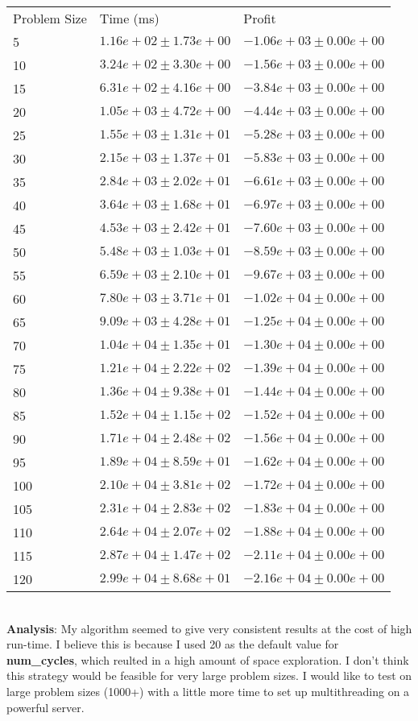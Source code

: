 \documentclass[11pt]{article}
\begin{document}
\begin{enumerate}
\begin{enumerate}
	\begin{tabular}{lll}
		Problem Size & Time (ms)         & Profit             \\
		5            & $1.16e+02\pm1.73e+00$ & $-1.06e+03\pm0.00e+00$ \\
		10           & $3.24e+02\pm3.30e+00$ & $-1.56e+03\pm0.00e+00$ \\
		15           & $6.31e+02\pm4.16e+00$ & $-3.84e+03\pm0.00e+00$ \\
		20           & $1.05e+03\pm4.72e+00$ & $-4.44e+03\pm0.00e+00$ \\
		25           & $1.55e+03\pm1.31e+01$ & $-5.28e+03\pm0.00e+00$ \\
		30           & $2.15e+03\pm1.37e+01$ & $-5.83e+03\pm0.00e+00$ \\
		35           & $2.84e+03\pm2.02e+01$ & $-6.61e+03\pm0.00e+00$ \\
		40           & $3.64e+03\pm1.68e+01$ & $-6.97e+03\pm0.00e+00$ \\
		45           & $4.53e+03\pm2.42e+01$ & $-7.60e+03\pm0.00e+00$ \\
		50           & $5.48e+03\pm1.03e+01$ & $-8.59e+03\pm0.00e+00 $\\
		55           & $6.59e+03\pm2.10e+01$ & $-9.67e+03\pm0.00e+00$ \\
		60           & $7.80e+03\pm3.71e+01$ & $-1.02e+04\pm0.00e+00$ \\
		65           & $9.09e+03\pm4.28e+01$ & $-1.25e+04\pm0.00e+00$ \\
		70           & $1.04e+04\pm1.35e+01$ & $-1.30e+04\pm0.00e+00$ \\
		75           & $1.21e+04\pm2.22e+02$ & $-1.39e+04\pm0.00e+00$ \\
		80           & $1.36e+04\pm9.38e+01$ & $-1.44e+04\pm0.00e+00$ \\
		85           & $1.52e+04\pm1.15e+02$ & $-1.52e+04\pm0.00e+00$ \\
		90           & $1.71e+04\pm2.48e+02$ & $-1.56e+04\pm0.00e+00$ \\
		95           & $1.89e+04\pm8.59e+01$ & $-1.62e+04\pm0.00e+00$ \\
		100          & $2.10e+04\pm3.81e+02$ & $-1.72e+04\pm0.00e+00$ \\
		105          & $2.31e+04\pm2.83e+02$ & $-1.83e+04\pm0.00e+00$ \\
		110          & $2.64e+04\pm2.07e+02$ & $-1.88e+04\pm0.00e+00 $\\
		115          & $2.87e+04\pm1.47e+02$ & $-2.11e+04\pm0.00e+00 $\\
		120          & $2.99e+04\pm8.68e+01$ & $-2.16e+04\pm0.00e+00$
	\end{tabular}
	\\
	{\bf Analysis}: My algorithm seemed to give very consistent results at the cost of high run-time. I believe this is because I used 20 as the default value for {\bf num\_cycles}, which reulted in a high amount of space exploration. I don't think this strategy would be feasible for very large problem sizes. I would like to test on large problem sizes (1000+) with a little more time to set up multithreading on a powerful server. 


\end{enumerate}
\end{enumerate}
\end{document}
